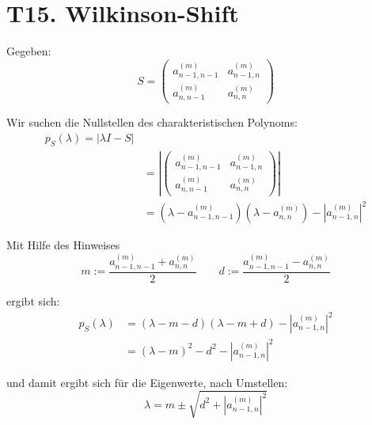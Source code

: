 \documentclass[11pt]{article}
\theoremstyle{plain}
\theoremstyle{definition}
\renewcommand{\u}{\"{u}}
\begin{document}
\section*{T15. Wilkinson-Shift}
Gegeben:
\begin{equation}
S= 
\begin{pmatrix}
a_{n-1,n-1}^{(m)} & a_{n-1,n}^{(m)} \\
a_{n,n-1}^{(m)} & a_{n,n}^{(m)} 
\end{pmatrix}
\end{equation}

Wir suchen die Nullstellen des charakteristischen Polynoms:
\begin{align}
p_S(\lambda) = |\lambda I-S| \\
&= \left| 
\begin{pmatrix}
a_{n-1,n-1}^{(m)} & a_{n-1,n}^{(m)} \\
a_{n,n-1}^{(m)} & a_{n,n}^{(m)} 
\end{pmatrix}
\right| \\
&= (\lambda - a_{n-1,n-1}^{(m)})(\lambda - a_{n,n}^{(m)}) - |a_{n-1,n}^{(m)}|^2
\end{align}

Mit Hilfe des Hinweises
\begin{equation}
m:=\frac{a_{n-1,n-1}^{(m)}+a_{n,n}^{(m)}}{2} \qquad d:=\frac{a_{n-1,n-1}^{(m)}-a_{n,n}^{(m)}}{2}
\end{equation}

ergibt sich:
\begin{align}
p_S(\lambda) &= (\lambda -m -d)(\lambda - m + d) - |a_{n-1,n}^{(m)}|^2\\
&= (\lambda - m)^2 - d^2 - |a_{n-1,n}^{(m)}|^2
\end{align}

und damit ergibt sich f\u r die Eigenwerte, nach Umstellen:
\begin{equation}
\lambda = m \pm \sqrt{d^2 + |a_{n-1,n}^{(m)}|^2}
\end{equation}
\end{document}
